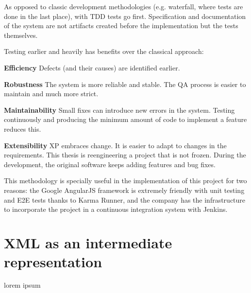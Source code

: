 As opposed to classic development methodologies (e.g. waterfall, where tests are done in the last place), with \ac{TDD} tests go first. 
Specification and documentation of the system are not artifacts created before the implementation but the tests themselves.

Testing earlier and heavily has benefits over the classical approach:

\textbf{Efficiency} Defects (and their causes) are identified earlier.

\textbf{Robustness} The system is more reliable and stable. 
The \ac{QA} process is easier to maintain and much more strict.

\textbf{Maintainability} Small fixes can introduce new errors in the system. 
Testing continuously and producing the minimum amount of code to implement a feature reduces this.

\textbf{Extensibility} \ac{XP} embraces change. 
It is easier to adapt to changes in the requirements. 
This thesis is reengineering a project that is not frozen. 
During the development, the original software keeps adding features and bug fixes.

This methodology is specially useful in the implementation of this project for two reasons: 
the Google AngularJS framework is extremely friendly with unit testing and \ac{E2E} tests thanks to Karma Runner, and the company has the infrastructure to incorporate the project in a continuous integration system with Jenkins.

\section{XML as an intermediate representation}

lorem ipsum
